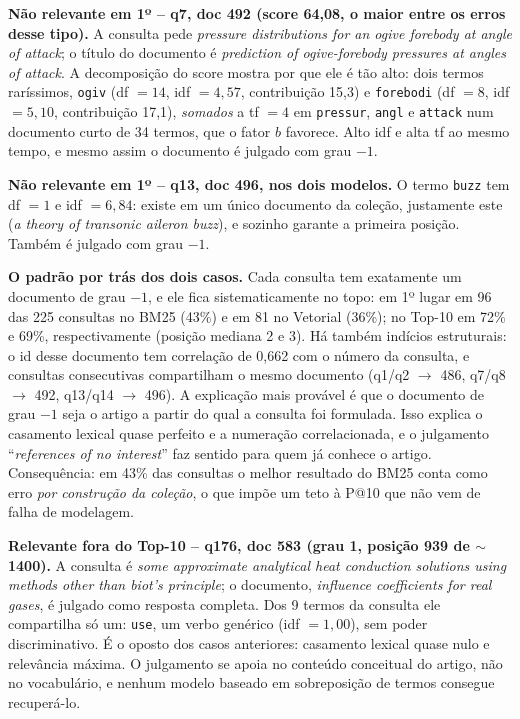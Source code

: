 \documentclass[10pt,a4paper]{article}
\newcommand{\term}[1]{\texttt{#1}}         %
\begin{document}
\textbf{Não relevante em 1º -- q7, doc 492 (score 64,08, o maior entre os erros desse tipo).} A
consulta pede \emph{pressure distributions for an ogive forebody at angle of attack}; o título do
documento é \emph{prediction of ogive-forebody pressures at angles of attack}. A decomposição do
score mostra por que ele é tão alto: dois termos raríssimos, \term{ogiv} (df $=14$, idf $=4{,}57$,
contribuição 15,3) e \term{forebodi} (df $=8$, idf $=5{,}10$, contribuição 17,1), \emph{somados} a
tf $=4$ em \term{pressur}, \term{angl} e \term{attack} num documento curto de 34 termos, que o fator
$b$ favorece. Alto idf e alta tf ao mesmo tempo, e mesmo assim o documento é julgado com grau $-1$.

\textbf{Não relevante em 1º -- q13, doc 496, nos dois modelos.} O termo \term{buzz} tem df $=1$ e
idf $=6{,}84$: existe em um único documento da coleção, justamente este (\emph{a theory of
transonic aileron buzz}), e sozinho garante a primeira posição. Também é julgado com grau $-1$.

\textbf{O padrão por trás dos dois casos.} Cada consulta tem exatamente um documento de grau
$-1$, e ele fica sistematicamente no topo: em 1º lugar em 96 das 225 consultas no BM25 (43\%) e
em 81 no Vetorial (36\%); no Top-10 em 72\% e 69\%, respectivamente (posição mediana 2 e 3). Há
também indícios estruturais: o id desse documento tem correlação de 0,662 com o número da consulta,
e consultas consecutivas compartilham o mesmo documento (q1/q2 $\to$ 486, q7/q8 $\to$ 492,
q13/q14 $\to$ 496). A explicação mais provável é que o documento de grau $-1$ seja o
artigo a partir do qual a consulta foi formulada. Isso explica o casamento lexical quase
perfeito e a numeração correlacionada, e o julgamento ``\emph{references of no interest}'' faz
sentido para quem já conhece o artigo. Consequência: em 43\% das consultas o melhor resultado do
BM25 conta como erro \emph{por construção da coleção}, o que impõe um teto à P@10 que não vem de
falha de modelagem.

\textbf{Relevante fora do Top-10 -- q176, doc 583 (grau 1, posição 939 de $\sim$1400).} A
consulta é \emph{some approximate analytical heat conduction solutions using methods other than
biot's principle}; o documento, \emph{influence coefficients for real gases}, é julgado como
resposta completa. Dos 9 termos da consulta ele compartilha só um: \term{use}, um verbo genérico
(idf $=1{,}00$), sem poder discriminativo. É o oposto dos casos anteriores: casamento lexical
quase nulo e relevância máxima. O julgamento se apoia no conteúdo conceitual do artigo, não no
vocabulário, e nenhum modelo baseado em sobreposição de termos consegue recuperá-lo.
\end{document}
